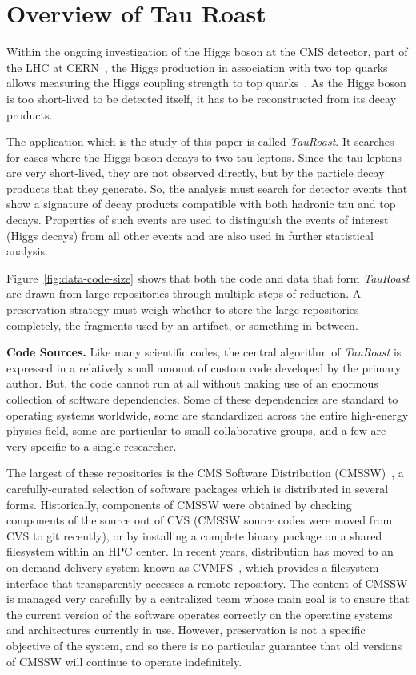 \documentclass{sig-alternate}
\begin{document}
\section{Overview of Tau Roast}

Within the ongoing investigation of the Higgs boson at the CMS
detector, part of the LHC at CERN~\cite{collaboration2008cms}, the Higgs production in association
with two top quarks allows measuring the Higgs coupling strength to
top quarks~\cite{chatrchyan2013search}.  As the Higgs boson is too short-lived to be detected
itself, it has to be reconstructed from its decay products.

The application which is the study of this paper is called \emph{TauRoast}.
It searches for cases where the Higgs boson decays to two tau leptons.
Since the tau leptons are very short-lived, they are not observed directly, but by the particle decay products 
that they generate.  So, the analysis must search for detector
events that show a signature of decay products compatible with both hadronic tau and top decays.  Properties of such events are used to distinguish
the events of interest (Higgs decays) from all other events and
are also used in further statistical analysis.

Figure~\ref{fig:data-code-size} shows that both the code and data
that form \emph{TauRoast} are drawn from large repositories through
multiple steps of reduction.  A preservation strategy must weigh
whether to store the large repositories completely, the fragments
used by an artifact, or something in between.

{\bf Code Sources.} Like many scientific codes, the central algorithm
of \emph{TauRoast} is expressed in a relatively small amount of
custom code developed by the primary author.  But, the code cannot
run at all without making use of an enormous collection of software
dependencies.  Some of these dependencies are standard to operating
systems worldwide, some are standardized across the entire high-energy
physics field, some are particular to small collaborative groups,
and a few are very specific to a single researcher.

The largest of these repositories is the CMS Software Distribution (CMSSW)~\cite{cms2006cms},
a carefully-curated selection of software packages which is distributed
in several forms.  Historically, components of CMSSW were obtained by checking components
of the source out of CVS (CMSSW source codes were moved from CVS to git recently), or by installing a complete binary package on a shared
filesystem within an HPC center.  In recent years, distribution has moved to
an on-demand delivery system known as CVMFS~\cite{blomer2011cernvm}, which
provides a filesystem interface that transparently accesses a remote repository.
The content of CMSSW is managed very carefully by a centralized team whose main goal
is to ensure that the current version of the software operates correctly
on the operating systems and architectures currently in use.  However,
preservation is not a specific objective of the system, and so there is
no particular guarantee that old versions of CMSSW will continue to
operate indefinitely.
\end{document}
